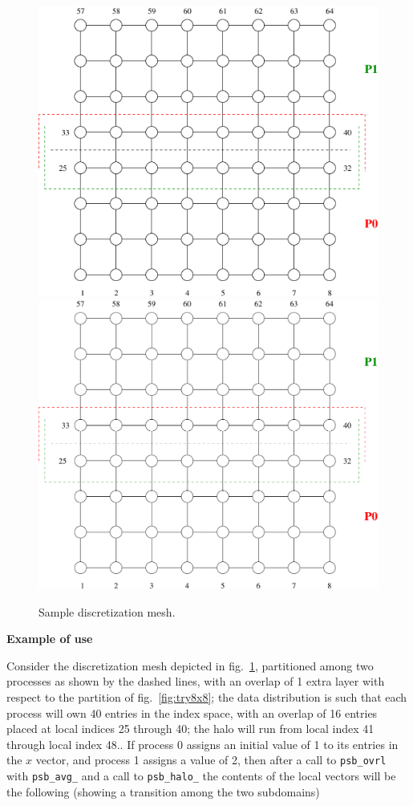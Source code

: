 \begin{figure}[h] 
\begin{center}
\ifcase\pdfoutput
\includegraphics[scale=0.65]{figures/try8x8_ov.png}
\or
{\includegraphics[scale=0.65]{figures/try8x8_ov}}
\fi
\end{center}
\caption{Sample discretization mesh.\label{fig:try8x8_ov}}
\end{figure}
{\par\noindent\large\bfseries Example of use}
Consider the discretization mesh depicted in fig.~\ref{fig:try8x8_ov},
partitioned among two processes as shown by the dashed lines, with an
overlap of 1 extra layer with respect to the partition of
fig.~\ref{fig:try8x8}; the data 
distribution is such that each process will own 40 entries in the
index space, with an overlap of 16  entries placed at local indices 25 
through 40; the halo will run from local index 41 through local index 48.. If process 0 assigns an initial value of 1 to its entries
in the $x$ vector, and process 1 assigns a value of 2, then after a
call to \verb|psb_ovrl| with \verb|psb_avg_| and a call to
\verb|psb_halo_| the contents of the local vectors will be the
following (showing a transition among the two subdomains)  

